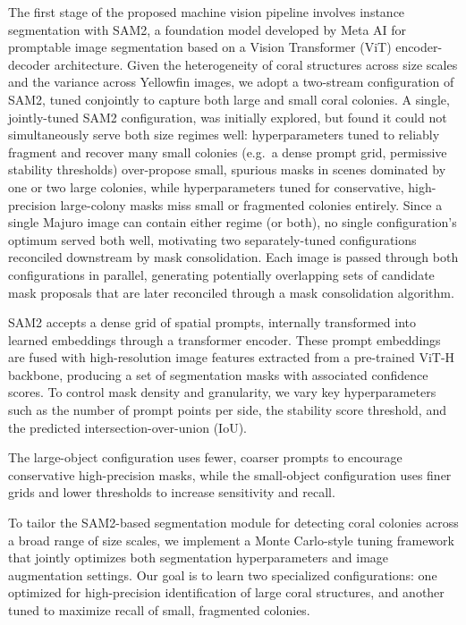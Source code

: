 \documentclass[11pt]{elsarticle}
\begin{document}
The first stage of the proposed machine vision pipeline involves instance segmentation with SAM2, a foundation model developed by Meta AI for promptable image segmentation based on a Vision Transformer (ViT) encoder-decoder architecture. Given the heterogeneity of coral structures across size scales and the variance across Yellowfin images, we adopt a two-stream configuration of SAM2, tuned conjointly to capture both large and small coral colonies. A single, jointly-tuned SAM2 configuration, was initially explored, but found it could not simultaneously serve both size regimes well: hyperparameters tuned to reliably fragment and recover many small colonies (e.g.\ a dense prompt grid, permissive stability thresholds) over-propose small, spurious masks in scenes dominated by one or two large colonies, while hyperparameters tuned for conservative, high-precision large-colony masks miss small or fragmented colonies entirely. Since a single Majuro image can contain either regime (or both), no single configuration's optimum served both well, motivating two separately-tuned configurations reconciled downstream by mask consolidation. Each image is passed through both configurations in parallel, generating potentially overlapping sets of candidate mask proposals that are later reconciled through a mask consolidation algorithm.

SAM2 accepts a dense grid of spatial prompts, internally transformed into learned embeddings through a transformer encoder. These prompt embeddings are fused with high-resolution image features extracted from a pre-trained ViT-H backbone, producing a set of segmentation masks with associated confidence scores. To control mask density and granularity, we vary key hyperparameters such as the number of prompt points per side, the stability score threshold, and the predicted intersection-over-union (IoU).

The large-object configuration uses fewer, coarser prompts to encourage conservative high-precision masks, while the small-object configuration uses finer grids and lower thresholds to increase sensitivity and recall.

To tailor the SAM2-based segmentation module for detecting coral colonies across a broad range of size scales, we implement a Monte Carlo-style tuning framework that jointly optimizes both segmentation hyperparameters and image augmentation settings. Our goal is to learn two specialized configurations: one optimized for high-precision identification of large coral structures, and another tuned to maximize recall of small, fragmented colonies.
\end{document}
